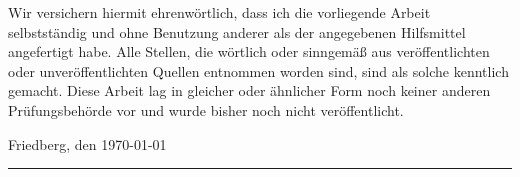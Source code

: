 \documentclass[
	ngerman,
	parskip=half,
	headsepline,
	fontsize=12pt,
	DIV=13,
	listof=leveldown,
	]{scrreprt}
\begin{document}
	Wir versichern hiermit ehrenwörtlich, dass ich die vorliegende Arbeit selbstständig und ohne Benutzung anderer als der angegebenen Hilfsmittel angefertigt habe. Alle Stellen, die wörtlich oder sinngemäß aus veröffentlichten oder unveröffentlichten Quellen entnommen worden sind, sind als solche kenntlich gemacht. Diese Arbeit lag in gleicher oder ähnlicher Form noch keiner anderen Prüfungsbehörde vor und wurde bisher noch nicht veröffentlicht.
	
	Friedberg, den \today
	
	
	\rule[-0.2cm]{5cm}{0.5pt}
	
	\textsc{\theauthor} 

	
	
	
	\printbibliography
\end{document}

